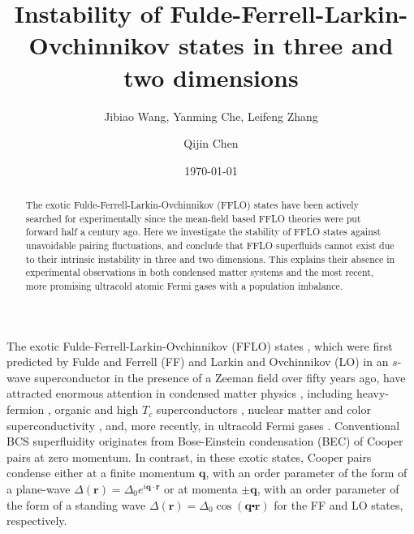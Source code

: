 \documentclass[aps,twocolumn,prl,tightenlines,floatfix]{revtex4-1}
\begin{document}

\title{Instability of Fulde-Ferrell-Larkin-Ovchinnikov states in three
  and two dimensions}

\author{Jibiao Wang, Yanming Che, Leifeng Zhang }
\author{Qijin Chen}


\date{\today}


\begin{abstract}
  The exotic Fulde-Ferrell-Larkin-Ovchinnikov (FFLO) states have been
  actively searched for experimentally since the mean-field based FFLO
  theories were put forward half a century ago.  Here we investigate
  the stability of FFLO states against unavoidable pairing
  fluctuations, and conclude that FFLO superfluids cannot exist due to
  their intrinsic instability in three and two dimensions. This
  explains their absence in experimental observations in both
  condensed matter systems and the most recent, more promising
  ultracold atomic Fermi gases with a population imbalance.
\end{abstract}


\maketitle


The exotic Fulde-Ferrell-Larkin-Ovchinnikov (FFLO) states , which were
first predicted by Fulde and Ferrell \cite{FF} (FF) and Larkin and
Ovchinnikov \cite{LO} (LO) in an $s$-wave superconductor in the
presence of a Zeeman field over fifty years ago, have attracted
enormous attention in condensed matter physics \cite{LOFF_Review},
including heavy-fermion \cite{Radovan,Kenzelmann}, organic
\cite{ShimaharaJPSJ71,*LebedPRB82} and high $T_c$ superconductors
\cite{GrafPRB72,*TingPRL96,*SimonsPRL102,*ChoPRA83,*Ptok2013}, nuclear
matter \cite{SedrakianPRC67} and color superconductivity
\cite{Alford,*Bowers}, and, more recently, in ultracold Fermi gases
\cite{SedrakianPRA72,*Liao,*Sheehy_RPP}. 
Conventional BCS superfluidity originates from Bose-Einstein
condensation (BEC) of Cooper pairs at zero momentum. In contrast, in
these exotic states, Cooper pairs condense either at a finite momentum
$\textbf{q}$, with an order parameter of the form of a plane-wave
$\Delta(\textbf{r})=\Delta_{0}e^{i\textbf{q}\cdot\textbf{r}}$ or at
momenta $\pm \textbf{q}$, with an order parameter of the form of a
standing wave
$\Delta(\textbf{r})=\Delta_{0}\cos(\textbf{q}\centerdot\textbf{r})$
for the FF and LO states, respectively. 
\end{document}
